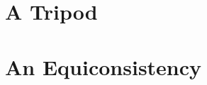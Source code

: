



\frontmatter





\setcounter{tocdepth}{2}
\tableofcontents
\thispagestyle{fancy}





\mainmatter

\newpage\part{A Tripod}



\newpage\part{An Equiconsistency}





\appendix


\backmatter
\pagestyle{fancy}

\nocite{*}



